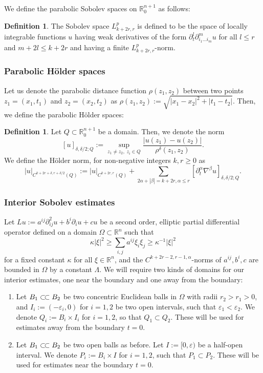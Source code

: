 \documentclass[10pt, a4paper]{article}
\theoremstyle{plain}%
\theoremstyle{definition}
\newtheorem{defn}[theorem]{Definition}
\numberwithin{figure}{section}
\numberwithin{equation}{section}
\newcommand{\bR}{\mathbb{R}}
\newcommand{\pa}{\partial}
\newcommand{\ssubset}{\subset\joinrel\subset}
\newcommand{\ep}{\varepsilon}
\begin{document}
We define the parabolic Sobolev spaces on $\bR^{n+1}_{0}$ as follows:
\begin{defn}
	The Sobolev space $L^p_{k+2r,r}$ is defined to be the space of locally integrable functions $u$ having weak derivatives of the form $\pa_t^l\pa^m_{i_1\dots i_m}u$ for all $l\leq r$ and $m+2l\leq k+2r$ and having a finite $L^p_{k+2r,r}$-norm.
\end{defn}
\subsubsection{Parabolic H\"{o}lder spaces}
 Let us denote the parabolic distance function $\rho(z_1,z_2)$ between two points $z_1= (x_1,t_1)$ and $z_2 = (x_2,t_2)$ as $\rho(z_1,z_2):= \sqrt{|x_1-x_2|^2+|t_1-t_2|}$. Then, we define the parabolic H\"{o}lder spaces:
\begin{defn}
	Let $Q\subset \bR^{n+1}_0$ be a domain. Then, we denote the norm \[
	[u]_{\delta,\delta/2;Q} := \sup_{z_1\neq z_2, \; z_i\in Q} \frac{|u(z_1)-u(z_2)|}{\rho^\delta(z_1,z_2)}.
	\] 
	We define the H\"{o}lder norm, for non-negative integers $k,r\geq 0$ as \[
	|u|_{C^{k+2r+\delta, r+\delta/2}(Q)} := |u|_{C^{k+2r,r}(Q)}+\sum_{2\alpha+|\beta|=k+2r, \alpha \leq r} [\pa_t^\alpha\nabla^\beta u]_{\delta,\delta/2; Q}.
	\]
\end{defn}

\subsubsection{Interior Sobolev estimates}
Let $Lu := a^{ij}\partial^2_{ij}u + b^i \partial_i u +cu$ be a second order, elliptic partial differential operator defined on a domain $\Omega \subset \mathbb{R}^n$ such that \[
\kappa |\xi|^2 \geq \sum_{i,j}a^{ij} \xi_i\xi_j \geq \kappa^{-1}|\xi|^2
\]  
for a fixed constant $\kappa$ for all $\xi \in \mathbb{R}^n$, and the $C^{k+2r-2,r-1,\alpha}$-norms of $a^{ij}, b^{i},c$ are bounded in $\Omega$ by a constant $\Lambda$. We will require two kinds of domains for our interior estimates, one near the boundary and one away from the boundary:
\begin{enumerate}
	\item Let $B_1 \ssubset B_2$ be two concentric Euclidean balls in $\Omega$ with radii $r_2>r_1>0$, and $I_i:= (-\ep_i,0)$ for $i=1,2$ be two open intervals, such that $\ep_1<\ep_2$. We denote $Q_i:=B_{i}\times I_i$ for $i=1,2$, so that $Q_1\subset Q_2$. These will be used for estimates away from the boundary $t=0$.
	\item Let $B_1\ssubset B_2$ be two open balls as before. Let $I:=[0,\varepsilon)$ be a half-open interval. We denote $P_i:=B_{i}\times I$ for $i=1,2$, such that $P_1\subset P_2$. These will be used for estimates near the boundary $t=0$.
\end{enumerate} 
\end{document}
